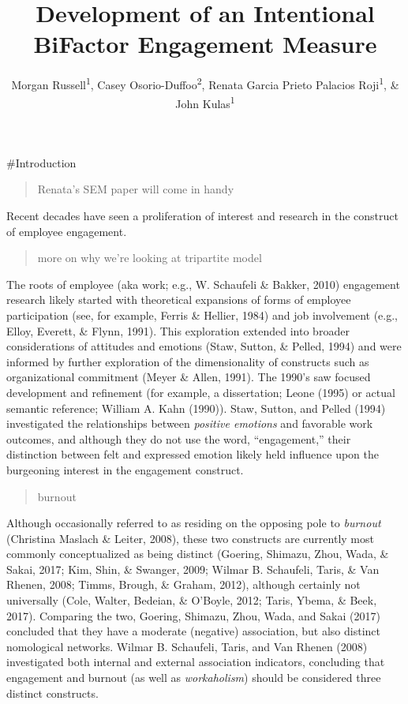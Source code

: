 \documentclass[
  english,
  man]{apa6}
\title{Development of an Intentional BiFactor Engagement Measure}
\author{Morgan Russell\textsuperscript{1}, Casey Osorio-Duffoo\textsuperscript{2}, Renata Garcia Prieto Palacios Roji\textsuperscript{1}, \& John Kulas\textsuperscript{1}}
\date{}
\affiliation{\vspace{0.5cm}\textsuperscript{1} Montclair State University\\\textsuperscript{2} Harver}
\begin{document}
\maketitle

\#Introduction

\begin{quote}
Renata's SEM paper will come in handy
\end{quote}

Recent decades have seen a proliferation of interest and research in the construct of employee engagement.

\begin{quote}
more on why we're looking at tripartite model
\end{quote}

The roots of employee (aka work; e.g., W. Schaufeli \& Bakker, 2010) engagement research likely started with theoretical expansions of forms of employee participation (see, for example, Ferris \& Hellier, 1984) and job involvement (e.g., Elloy, Everett, \& Flynn, 1991). This exploration extended into broader considerations of attitudes and emotions (Staw, Sutton, \& Pelled, 1994) and were informed by further exploration of the dimensionality of constructs such as organizational commitment (Meyer \& Allen, 1991). The 1990's saw focused development and refinement (for example, a dissertation; Leone (1995) or actual semantic reference; William A. Kahn (1990)). Staw, Sutton, and Pelled (1994) investigated the relationships between \emph{positive emotions} and favorable work outcomes, and although they do not use the word, ``engagement,'' their distinction between felt and expressed emotion likely held influence upon the burgeoning interest in the engagement construct.

\begin{quote}
burnout
\end{quote}

Although occasionally referred to as residing on the opposing pole to \emph{burnout} (Christina Maslach \& Leiter, 2008), these two constructs are currently most commonly conceptualized as being distinct (Goering, Shimazu, Zhou, Wada, \& Sakai, 2017; Kim, Shin, \& Swanger, 2009; Wilmar B. Schaufeli, Taris, \& Van Rhenen, 2008; Timms, Brough, \& Graham, 2012), although certainly not universally (Cole, Walter, Bedeian, \& O'Boyle, 2012; Taris, Ybema, \& Beek, 2017). Comparing the two, Goering, Shimazu, Zhou, Wada, and Sakai (2017) concluded that they have a moderate (negative) association, but also distinct nomological networks. Wilmar B. Schaufeli, Taris, and Van Rhenen (2008) investigated both internal and external association indicators, concluding that engagement and burnout (as well as \emph{workaholism}) should be considered three distinct constructs.
\end{document}
